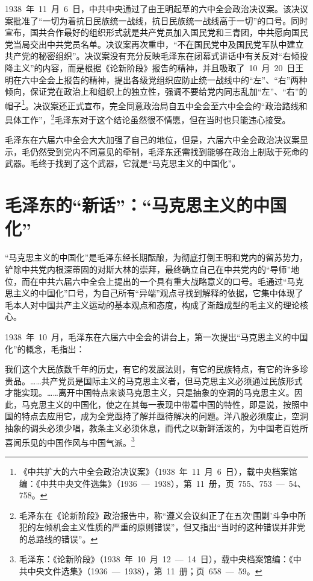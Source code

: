 1938~年~11~月~6~日，中共中央通过了由王明起草的六中全会政治决议案。该决议案批准了“一切为着抗日民族统一战线，抗日民族统一战线高于一切”的口号。同时宣布，国共合作最好的组织形式就是共产党员加入国民党和三青团，中共愿向国民党当局交出中共党员名单。决议案再次重申，“不在国民党中及国民党军队中建立共产党的秘密组织”。决议案没有充分反映毛泽东在闭幕式讲话中有关反对“右倾投降主义”的内容，而是根据《论新阶段》报告的精神，并且吸取了~10~月~20~日王明在六中全会上报告的精神，提出各级党组织应防止统一战线中的“左”、“右”两种倾向，保证党在政治上和组织上的独立性，强调不要给党内同志乱加“左”、“右”的帽子\footnote{《中共扩大的六中全会政治决议案》（1938~年~11~月~6~日），载中央档案馆编：《中共中央文件选集》（1936~—~1938），第~11~册，页~755、753~—~54、758。}。决议案还正式宣布，完全同意政治局自五中全会至六中全会的“政治路线和具体工作”，\footnote{毛泽东在《论新阶段》政治报告中，称“遵义会议纠正了在五次‘围剿’斗争中所犯的左倾机会主义性质的严重的原则错误”，但又指出“当时的这种错误并非党的总路线的错误”。}毛泽东对于这个结论虽然很不情愿，但在当时也只能违心接受。

毛泽东在六届六中全会大大加强了自己的地位，但是，六届六中全会政治决议案显示，毛仍然受到党内不同意见的牵制，毛泽东还需找到能够在政治上制敌于死命的武器。毛终于找到了这个武器，它就是“马克思主义的中国化”。

\section{毛泽东的“新话”：“马克思主义的中国化”}

“马克思主义的中国化”是毛泽东经长期酝酿，为彻底打倒王明和党内的留苏势力，铲除中共党内根深蒂固的对斯大林的崇拜，最终确立自己在中共党内的“导师”地位，而在中共六届六中全会上提出的一个具有重大战略意义的口号。毛通过“马克思主义的中国化”口号，为自己所有“异端”观点寻找到解释的依据，它集中体现了毛本人对中国共产主义运动的基本观点和态度，构成了渐趋成型的毛主义的理论核心。

1938~年~10~月，毛泽东在六届六中全会的讲台上，第一次提出“马克思主义的中国化”的概念，毛指出：

\begin{quoting}
我们这个大民族数千年的历史，有它的发展法则，有它的民族特点，有它的许多珍贵品。……共产党员是国际主义的马克思主义者，但马克思主义必须通过民族形式才能实现。……离开中国特点来谈马克思主义，只是抽象的空洞的马克思主义。因此，马克思主义的中国化，使之在其每一表现中带着中国的特性，即是说，按照中国的特点去应用它，成为全党亟持了解并亟待解决的问题。洋八股必须废止，空洞抽象的调头必须少唱，教条主义必须休息，而代之以新鲜活泼的，为中国老百姓所喜闻乐见的中国作风与中国气派。\footnote{毛泽东：《论新阶段》（1938~年~10~月~12~—~14~日），载中央档案馆编：《中共中央文件选集》（1936~—~1938），第~11~册；页~658~—~59。}
\end{quoting}

